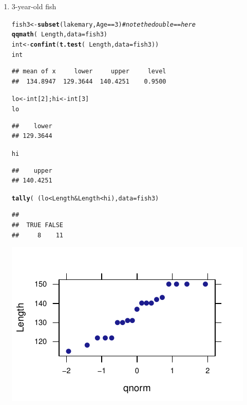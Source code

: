 \documentclass[twoside]{book}\usepackage[]{graphicx}\usepackage[]{xcolor}
\makeatletter
\def\maxwidth{ %
  \ifdim\Gin@nat@width>\linewidth
    \linewidth
  \else
    \Gin@nat@width
  \fi
}
\newcommand{\hlnum}[1]{\textcolor[rgb]{0.686,0.059,0.569}{#1}}%
\newcommand{\hlcom}[1]{\textcolor[rgb]{0.678,0.584,0.686}{\textit{#1}}}%
\newcommand{\hlopt}[1]{\textcolor[rgb]{0,0,0}{#1}}%
\newcommand{\hlstd}[1]{\textcolor[rgb]{0.345,0.345,0.345}{#1}}%
\newcommand{\hlkwb}[1]{\textcolor[rgb]{0.69,0.353,0.396}{#1}}%
\newcommand{\hlkwc}[1]{\textcolor[rgb]{0.333,0.667,0.333}{#1}}%
\newcommand{\hlkwd}[1]{\textcolor[rgb]{0.737,0.353,0.396}{\textbf{#1}}}%
\newenvironment{kframe}{%
 \def\at@end@of@kframe{}%
 \ifinner\ifhmode%
  \def\at@end@of@kframe{\end{minipage}}%
  \begin{minipage}{\columnwidth}%
 \fi\fi%
 \def\FrameCommand##1{\hskip\@totalleftmargin \hskip-\fboxsep
 \colorbox{shadecolor}{##1}\hskip-\fboxsep
     \hskip-\linewidth \hskip-\@totalleftmargin \hskip\columnwidth}%
 \MakeFramed {\advance\hsize-\width
   \@totalleftmargin\z@ \linewidth\hsize
   \@setminipage}}%
 {\par\unskip\endMakeFramed%
 \at@end@of@kframe}
\newenvironment{knitrout}{}{} %
\makeatother
\begin{document}
\begin{solution}
\begin{enumerate}
\item 3-year-old fish
\begin{knitrout}
\color{fgcolor}\begin{kframe}
\begin{alltt}
\hlstd{fish3} \hlkwb{<-} \hlkwd{subset}\hlstd{(lakemary, Age}\hlopt{==}\hlnum{3}\hlstd{)}  \hlcom{# note the double == here}
\hlkwd{qqmath}\hlstd{(}\hlopt{~}\hlstd{Length,} \hlkwc{data}\hlstd{=fish3)}
\hlstd{int} \hlkwb{<-} \hlkwd{confint}\hlstd{(}\hlkwd{t.test}\hlstd{(}\hlopt{~}\hlstd{Length,} \hlkwc{data}\hlstd{=fish3))}
\hlstd{int}
\end{alltt}
\begin{verbatim}
## mean of x     lower     upper     level 
##  134.8947  129.3644  140.4251    0.9500
\end{verbatim}
\begin{alltt}
\hlstd{lo} \hlkwb{<-} \hlstd{int[}\hlnum{2}\hlstd{]; hi} \hlkwb{<-} \hlstd{int[}\hlnum{3}\hlstd{]}
\hlstd{lo}
\end{alltt}
\begin{verbatim}
##    lower 
## 129.3644
\end{verbatim}
\begin{alltt}
\hlstd{hi}
\end{alltt}
\begin{verbatim}
##    upper 
## 140.4251
\end{verbatim}
\begin{alltt}
\hlkwd{tally} \hlstd{(} \hlopt{~} \hlstd{( lo} \hlopt{<} \hlstd{Length} \hlopt{&} \hlstd{Length} \hlopt{<} \hlstd{hi ),} \hlkwc{data}\hlstd{=fish3 )}
\end{alltt}
\begin{verbatim}
## 
##  TRUE FALSE 
##     8    11
\end{verbatim}
\end{kframe}

{\centering \includegraphics[width=\maxwidth]{figures/fig-unnamed-chunk-153-1} 

}
\end{knitrout}
\end{enumerate}
\end{solution}
\end{document}
